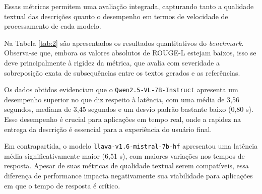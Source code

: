 Essas métricas permitem uma avaliação integrada, capturando tanto a qualidade textual das descrições quanto o desempenho em termos de velocidade de processamento de cada modelo. 

Na Tabela \ref{tab:2} são apresentados os resultados quantitativos do \textit{benchmark}. Observa-se que, embora os valores absolutos de ROUGE-L estejam baixos, isso se deve principalmente à rigidez da métrica, que avalia com severidade a sobreposição exata de subsequências entre os textos gerados e as referências.

\begin{table}[!ht]
\centering
\caption{Desempenho médio dos modelos em termos de latência e qualidade textual}
\label{tab:2}
\caption*{\textbf{Fonte:} Elaborado pelo Autor (2025)}
\end{table}

Os dados obtidos evidenciam que o \lstinline{Qwen2.5-VL-7B-Instruct} apresenta um desempenho superior no que diz respeito à latência, com uma média de 3,56 segundos, mediana de 3,45 segundos e um desvio padrão bastante baixo (0,80 s). Esse desempenho é crucial para aplicações em tempo real, onde a rapidez na entrega da descrição é essencial para a experiência do usuário final.

Em contrapartida, o modelo \lstinline{llava-v1.6-mistral-7b-hf} apresentou uma latência média significativamente maior (6,51 s), com maiores variações nos tempos de resposta. Apesar de suas métricas de qualidade textual serem compatíveis, essa diferença de performance impacta negativamente sua viabilidade para aplicações em que o tempo de resposta é crítico.

